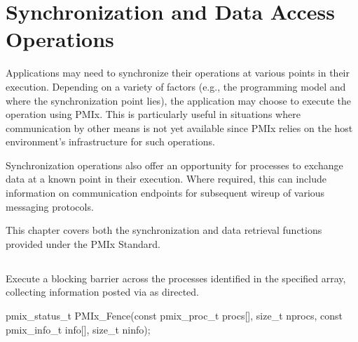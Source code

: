 \chapter{Synchronization and Data Access Operations}
\label{chap:api_sync_acc}

Applications may need to synchronize their operations at various points in
their execution. Depending on a variety of factors (e.g., the programming
model and where the synchronization point lies), the application may choose to
execute the operation using \ac{PMIx}. This is particularly useful in
situations where communication by other means is not yet available since
\ac{PMIx} relies on the host environment's infrastructure for such operations.

Synchronization operations also offer an opportunity for processes to exchange
data at a known point in their execution. Where required, this can include
information on communication endpoints for subsequent wireup of various
messaging protocols.

This chapter covers both the synchronization and data retrieval functions
provided under the \ac{PMIx} Standard.

\section{}

\summary

Execute a blocking barrier across the processes identified in the specified array, collecting information posted via  as directed.

\format

\cspecificstart
\begin{codepar}
pmix_status_t
PMIx_Fence(const pmix_proc_t procs[], size_t nprocs,
           const pmix_info_t info[], size_t ninfo);
\end{codepar}
\cspecificend

\begin{arglist}
\end{arglist}

